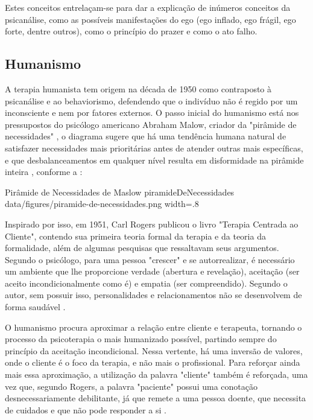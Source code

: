 Estes conceitos entrelaçam-se para dar a explicação de inúmeros conceitos da psicanálise, como as possíveis manifestações do ego (ego inflado, ego frágil, ego forte, dentre outros), como o princípio do prazer e como o ato falho.

\subsection{Humanismo}
\label{sec:Humanismo}
A terapia humanista tem origem na década de 1950 como contraposto à psicanálise e ao behaviorismo, defendendo que o indivíduo não é regido por um inconsciente e nem por fatores externos. O passo inicial do humanismo está nos pressupostos do psicólogo americano Abraham Malow, criador da "pirâmide de necessidades" \cite{Pimenta2019}, o diagrama sugere que há uma tendência humana natural de satisfazer necessidades mais prioritárias antes de atender outras mais específicas, e que desbalanceamentos em qualquer nível resulta em disformidade na pirâmide inteira \cite{Mcleod2023}, conforme a :

\image
    {Pirâmide de Necessidades de Maslow}
    {piramideDeNecessidades}
    {data/figures/piramide-de-necessidades.png}
    {width=.8\textwidth}
    {}

Inspirado por isso, em 1951, Carl Rogers publicou o livro "Terapia Centrada ao Cliente", contendo sua primeira teoria formal da terapia e da teoria da formalidade, além de algumas pesquisas que ressaltavam seus argumentos. Segundo o psicólogo, para uma pessoa "crescer" e se autorrealizar, é necessário um ambiente que lhe proporcione verdade (abertura e revelação), aceitação (ser aceito incondicionalmente como é) e empatia (ser compreendido). Segundo o autor, sem possuir isso, personalidades e relacionamentos não se desenvolvem de forma saudável \cite{Pimenta2019}.

O humanismo procura aproximar a relação entre cliente e terapeuta, tornando o processo da psicoterapia o mais humanizado possível, partindo sempre do princípio da aceitação incondicional. Nessa vertente, há uma inversão de valores, onde o cliente é o foco da terapia, e não mais o profissional. Para reforçar ainda mais essa aproximação, a utilização da palavra "cliente" também é reforçada, uma vez que, segundo Rogers, a palavra "paciente" possui uma conotação desnecessariamente debilitante, já que remete a uma pessoa doente, que necessita de cuidados e que não pode responder a si \cite{Barros2022}.

